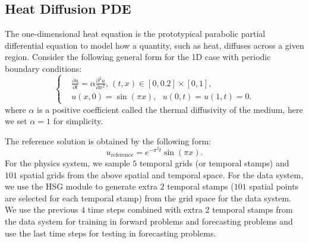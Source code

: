 \documentclass[preprint,11pt]{elsarticle}
\begin{document}
\subsection{Heat Diffusion PDE}
The one-dimensional heat equation is the prototypical parabolic partial differential equation to model how a quantity, such as heat, diffuses across a given region. Consider the following general form for the 1D case with periodic boundary conditions: 
\begin{equation}
\left\{\begin{aligned}
    &\frac{\partial u}{\partial t} = \alpha \frac{\partial^2 u}{\partial x^2},\,(t,x)\in [0,0.2]\times[0,1],\\
    &u(x,0)=\sin(\pi x), \:\:\:  u(0,t) = u(1,t) = 0.
    \end{aligned}\right.
\end{equation}
where $\alpha$ is a positive coefficient called the thermal diffusivity of the medium, here we set $\alpha = 1$ for simplicity.

The reference solution is obtained by the following form:
\begin{equation}
    u_{\text{reference}} =  e^{-\pi^2 t}\sin(\pi x).
\end{equation}
For the physics system, we sample $5$ temporal grids (or temporal stamps) and $101$ spatial grids from the above spatial and temporal space. For the data system, we use the HSG module to generate extra $2$ temporal stamps ($101$ spatial points are selected for each temporal stamp) from the grid space for the data system. We use the previous $4$ time steps combined with extra 2 temporal stamps from the data system for training in forward problems and forecasting problems and use the last time steps for testing in forecasting problems. 
\end{document}
